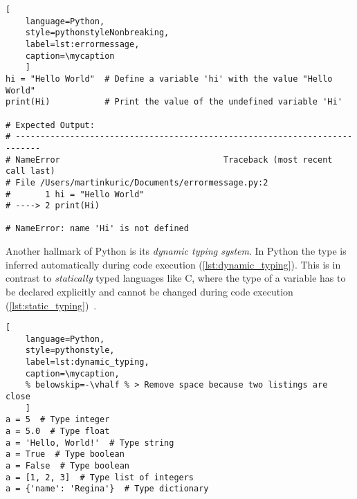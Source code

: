 \def\mycaption{Example of an error message. Since Python is case-sensitive, the
    error is caused by misspelling the variable name \texttt{hi} as \texttt{Hi}.
    The error message begins with the type of error (\texttt{NameError}),
    followed by a traceback that shows the sequence of function calls that led
    to the error. The traceback located the source of the error in the file
    \texttt{errormessage.py} and points to the line that caused the error.
    Finally, the error message explains the error, stating that \texttt{'Hi'} is
    undefined. }
\begin{lstlisting}[
    language=Python, 
    style=pythonstyleNonbreaking,
    label=lst:errormessage,
    caption=\mycaption
    ]
hi = "Hello World"  # Define a variable 'hi' with the value "Hello World"
print(Hi)           # Print the value of the undefined variable 'Hi'

# Expected Output:
# ---------------------------------------------------------------------------
# NameError                                 Traceback (most recent call last)
# File /Users/martinkuric/Documents/errormessage.py:2
#       1 hi = "Hello World"
# ----> 2 print(Hi)

# NameError: name 'Hi' is not defined
\end{lstlisting}



Another hallmark of Python is its \textit{dynamic typing system}. In Python the
type is inferred automatically during code execution
(\autoref{lst:dynamic_typing}). This is in contrast to \textit{statically} typed
languages like C, where the type of a variable has to be declared explicitly and
cannot be changed during code execution
(\autoref{lst:static_typing})~\cite{PythonLanguageReference2024}.

\def\mycaption{ Example of dynamic typing in Python. The variable ``\texttt{a}''
    is assigned the value 5, which is of type integer. The variable
    ``\texttt{a}'' is then overwritten with the value ``\texttt{Hello,
        World!}'', which is of type string. Python allows dynamic re-assignment of
    variables with different types. Note that code after ``\texttt{\#}'' is
    considered a comment and won't be executed.}
\begin{lstlisting}[
    language=Python,
    style=pythonstyle,
    label=lst:dynamic_typing,
    caption=\mycaption,
    % belowskip=-\vhalf % > Remove space because two listings are close
    ]
a = 5  # Type integer
a = 5.0  # Type float
a = 'Hello, World!'  # Type string
a = True  # Type boolean
a = False  # Type boolean
a = [1, 2, 3]  # Type list of integers
a = {'name': 'Regina'}  # Type dictionary
\end{lstlisting}

